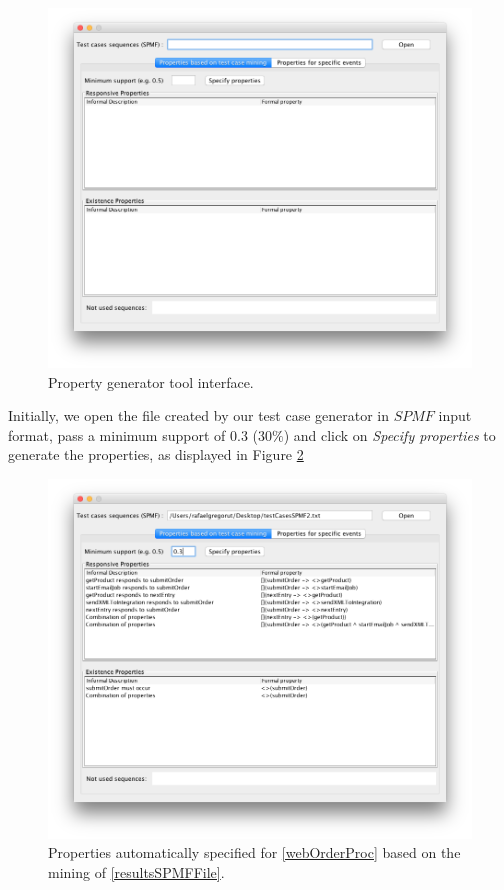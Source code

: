 \begin{figure}[htb]
\centering
\includegraphics[width=\textwidth]{figuras/propGenClean}
\caption{\label{propGenClean} Property generator tool interface.}
\end{figure}

Initially, we open the file created by our test case generator in $SPMF$ input format, pass a minimum support of 0.3 ($30\%$) and click on \textit{Specify properties} to generate the properties, as displayed in Figure \ref{propGenMining}

\begin{figure}[htb]
\centering
\includegraphics[width=\textwidth]{figuras/propGenMining}
\caption{\label{propGenMining} Properties automatically specified for \ref{webOrderProc} based on the mining of \ref{resultsSPMFFile}.}
\end{figure}

